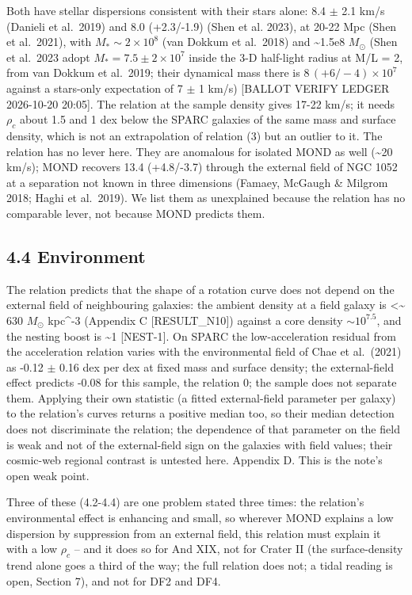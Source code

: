 \documentclass[
  10pt,
]{article}
\begin{document}
Both have stellar dispersions consistent with
their stars alone: 8.4 $\pm$ 2.1 km/s (Danieli et al.~2019) and 8.0
(+2.3/-1.9) (Shen et al. 2023), at 20-22 Mpc (Shen et al.~2021), with
$M_*\sim 2\times10^8$ (van Dokkum et al.~2018) and
\textasciitilde{}1.5e8 $M_\odot$ (Shen et al.~2023 adopt $M_*=7.5\pm2\times10^7$ inside the 3-D half-light radius at M/L = 2, from van Dokkum et
al.~2019; their dynamical mass there is $8\,(+6/-4)\times10^7$ against a
stars-only expectation of 7 $\pm$ 1 km/s) {[}BALLOT VERIFY LEDGER
2026-10-20 20:05{]}. The relation at the sample density gives 17-22 km/s; it
needs $\rho_c$ about 1.5 and 1 dex below the SPARC galaxies of the same
mass and surface density, which is not an extrapolation of relation (3)
but an outlier to it. The relation has no lever here. They are anomalous for
isolated MOND as well (\textasciitilde{}20 km/s); MOND recovers 13.4
(+4.8/-3.7) through the external field of NGC 1052 at a separation not
known in three dimensions (Famaey, McGaugh \& Milgrom 2018; Haghi et
al.~2019). We list them as unexplained because the relation has no comparable
lever, not because MOND predicts them.

\subsection{4.4 Environment}

The relation predicts that the shape of a rotation curve
does not depend on the external field of neighbouring galaxies: the ambient density at a field galaxy is \textless{}\textasciitilde{} 630 $M_\odot$ kpc\^{}-3 (Appendix C {[}RESULT\_N10{]}) against a core density
$\sim 10^{7.5}$, and the nesting boost is \textasciitilde{}1
{[}NEST-1{]}. On SPARC the low-acceleration residual from the
acceleration relation varies with the environmental field of Chae et
al.~(2021) as -0.12 $\pm$ 0.16 dex per dex at fixed mass and surface
density; the external-field effect predicts -0.08 for this sample, the
relation 0; the sample does not separate them. Applying their own statistic
(a fitted external-field parameter per galaxy) to the relation's curves
returns a positive median too, so their median detection does not
discriminate the relation; the dependence of that parameter on the field is
weak and not of the external-field sign on the galaxies with field
values; their cosmic-web regional contrast is untested here. Appendix D.
This is the note's open weak point.

Three of these (4.2-4.4) are one problem stated three times: the relation's
environmental effect is enhancing and small, so wherever MOND explains a
low dispersion by suppression from an external field, this relation must
explain it with a low $\rho_c$ -- and it does so for And XIX, not for
Crater II (the surface-density trend alone goes a third of the way; the full relation does not; a tidal reading is open, Section 7), and not for DF2 and DF4.
\end{document}
